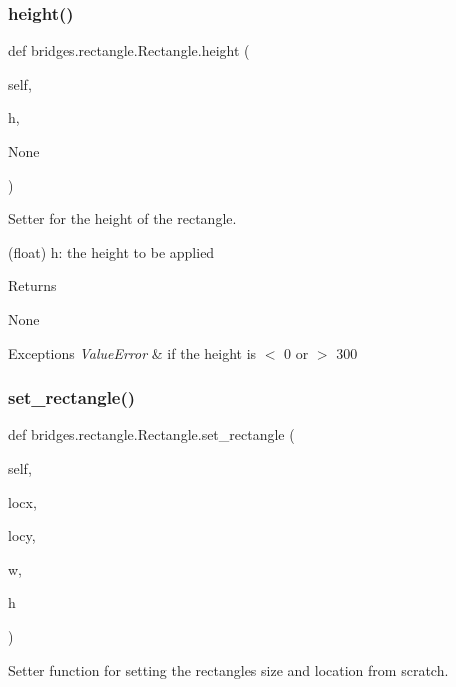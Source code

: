 \subsubsection{\texorpdfstring{height()}{height()}\hspace{0.1cm}{\footnotesize\ttfamily [2/2]}}
{\footnotesize\ttfamily def bridges.\+rectangle.\+Rectangle.\+height (\begin{DoxyParamCaption}\item[{}]{self,  }\item[{}]{h,  }\item[{}]{None }\end{DoxyParamCaption})}



Setter for the height of the rectangle. 

(float) h\+: the height to be applied \begin{DoxyReturn}{Returns}


None
\end{DoxyReturn}

\begin{DoxyExceptions}{Exceptions}
{\em Value\+Error} & if the height is $<$ 0 or $>$ 300 \\
\hline
\end{DoxyExceptions}
\mbox{\label{classbridges_1_1rectangle_1_1_rectangle_a187376dcdc5c10c5b1ce5f3f00a80961}} 
\subsubsection{\texorpdfstring{set\+\_\+rectangle()}{set\_rectangle()}}
{\footnotesize\ttfamily def bridges.\+rectangle.\+Rectangle.\+set\+\_\+rectangle (\begin{DoxyParamCaption}\item[{}]{self,  }\item[{}]{locx,  }\item[{}]{locy,  }\item[{}]{w,  }\item[{}]{h }\end{DoxyParamCaption})}



Setter function for setting the rectangles size and location from scratch. 

